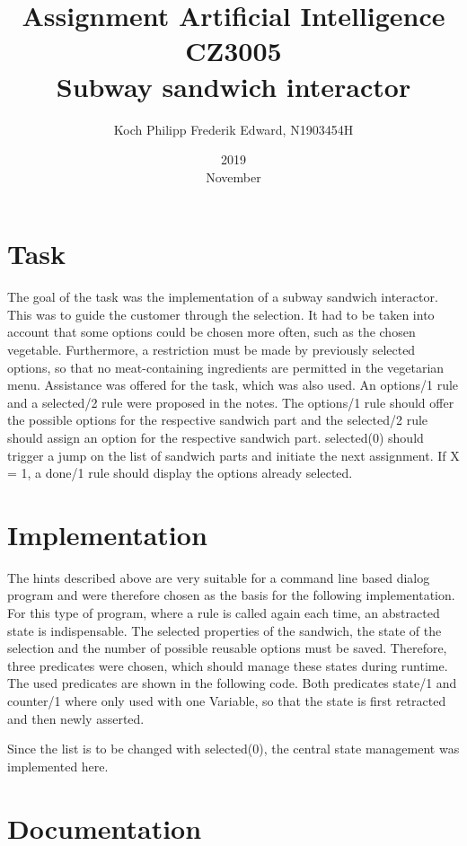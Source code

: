 \documentclass{article}
\title{Assignment Artificial Intelligence CZ3005 \\ Subway sandwich interactor}
\date{2019 \\ November}
\author{Koch Philipp Frederik Edward, N1903454H}
\begin{document}
	\maketitle
	\section{Task}
	The goal of the task was the implementation of a subway sandwich interactor. This was to guide the customer through the selection. It had to be taken into account that some options could be chosen more often, such as the chosen vegetable. Furthermore, a restriction must be made by previously selected options, so that no meat-containing ingredients are permitted in the vegetarian menu. Assistance was offered for the task, which was also used. An options/1 rule and a selected/2 rule were proposed in the notes. The options/1 rule should offer the possible options for the respective sandwich part and the selected/2 rule should assign an option for the respective sandwich part. selected(0) should trigger a jump on the list of sandwich parts and initiate the next assignment. If X = 1, a done/1 rule should display the options already selected. 

	\section{Implementation}
	The hints described above are very suitable for a command line based dialog program and were therefore chosen as the basis for the following implementation. For this type of program, where a rule is called again each time, an abstracted state is indispensable. The selected properties of the sandwich, the state of the selection and the number of possible reusable options must be saved. Therefore, three predicates were chosen, which should manage these states during runtime. The used predicates are shown in the following code. Both predicates state/1 and counter/1 where only used with one Variable, so that the state is first retracted and then newly asserted.
	
	
	
	
	Since the list is to be changed with selected(0), the central state management was implemented here.
	
	
	\section{Documentation}
\end{document}
